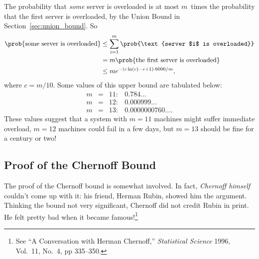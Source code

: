 The probability that \emph{some} server is overloaded is at most
$m$~times the probability that the first server is overloaded, by the
Union Bound in Section~\ref{sec:union_bound}.  So
\begin{align*}
\prob{\text{some server is overloaded}}
    &\le \sum_{i = 1}^m \prob{\text{server $i$ is overloaded}} \\
    &= m \prob{\text{the first server is overloaded}} \\
    &\leq m e^{-(c \ln(c) - c + 1) \cdot 6000 / m},
\end{align*}
where $c = m/10$.  Some values of this upper bound are tabulated below:
\[
\begin{array}{rcll}
m & = & 11: & 0.784\dots \\
m & = & 12: & 0.000999\dots \\
m & = & 13: & 0.0000000760\dots .
\end{array}
\]
These values suggest that a system with $m = 11$ machines might suffer
immediate overload, $m = 12$ machines could fail in a few days, but $m
= 13$ should be fine for a century or two!

\subsection{Proof of the Chernoff Bound}\label{sec:chernoff_proof}

The proof of the Chernoff bound is somewhat involved.  In fact,
\emph{Chernoff himself} couldn't come up with it: his friend,
 Herman Rubin, showed him the argument.
Thinking the bound not very significant, Chernoff did not credit Rubin
in print.  He felt pretty bad when it became famous!\footnote{See ``A
  Conversation with Herman Chernoff,'' \emph{Statistical Science}
  1996, Vol.~11, No.~4, pp 335--350.}

\iffalse

Here is the theorem again, for reference:

\begin{theorem}[\idx{Chernoff Bound}]
Let $T_1, \dots, T_n$ be mutually independent random variables such
that $0 \leq T_i \leq 1$ for all $i$.  Let $T = T_1 + \cdots + T_n$.
Then for all $c \geq 1$,
\begin{equation}
\prob{T \geq c \expect{T}} \leq e^{-k \expect{T}}
\tag{\ref{chernoff-leq}}
\end{equation}
where $\beta(c) \eqdef c \ln(c) - c + 1$.
\end{theorem}
\fi

